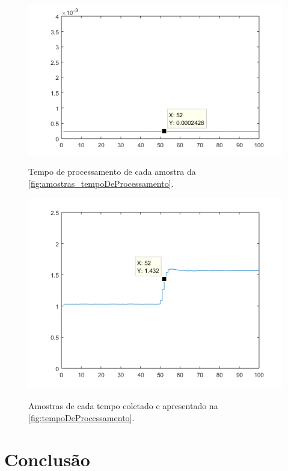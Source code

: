\documentclass[
	article,			%
	11pt,				%
	oneside,			%
	a4paper,			%
	english,			%
	brazil,				%
	sumario=tradicional
	]{abntex2}
\begin{document}
\begin{figure}[htb!]
	\centering
	\caption{Tempo de processamento de cada amostra da \autoref{fig:amostras_tempoDeProcessamento}.}
	\includegraphics[scale=0.6]{./img/tempoDeProcessamento.png}
	\label{fig:tempoDeProcessamento}
\end{figure}

\begin{figure}[htb!]
	\centering
	\caption{Amostras de cada tempo coletado e apresentado na \autoref{fig:tempoDeProcessamento}.}
	\includegraphics[scale=0.6]{./img/amostras_tempoDeProcessamento.png}
	\label{fig:amostras_tempoDeProcessamento}
\end{figure}



\pagebreak

\section{\textbf{Conclusão}}
 
\end{document}
